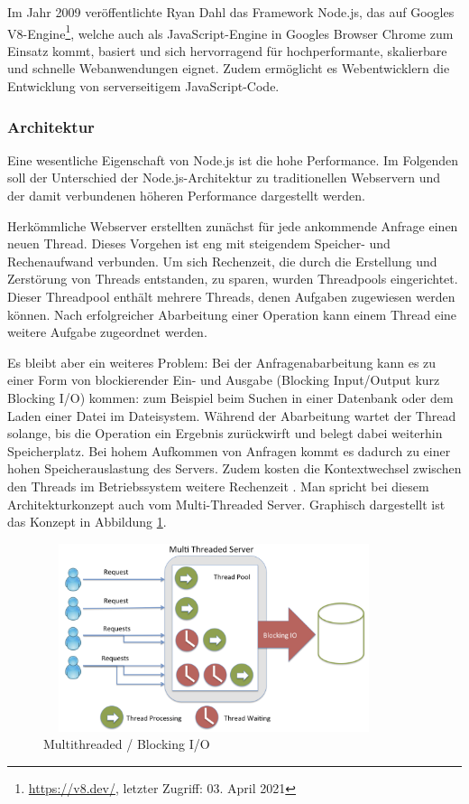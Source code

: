 Im Jahr 2009 veröffentlichte Ryan Dahl das Framework Node.js, das auf Googles V8-Engine\footnote{\url{https://v8.dev/}, letzter Zugriff: 03. April 2021}, welche auch als JavaScript-Engine in Googles Browser Chrome zum Einsatz kommt, basiert und sich hervorragend für hochperformante, skalierbare und schnelle Webanwendungen eignet. Zudem ermöglicht es Webentwicklern die Entwicklung von serverseitigem JavaScript-Code.


\subsubsection{Architektur}
Eine wesentliche Eigenschaft von Node.js ist die hohe Performance. Im Folgenden soll der Unterschied der Node.js-Architektur zu traditionellen Webservern und der damit verbundenen höheren Performance dargestellt werden.
\newline

\noindent
Herkömmliche Webserver erstellten zunächst für jede ankommende Anfrage einen neuen Thread. Dieses Vorgehen ist eng mit steigendem Speicher- und Rechenaufwand verbunden. Um sich Rechenzeit, die durch die Erstellung und Zerstörung von Threads entstanden, zu sparen, wurden Threadpools eingerichtet. Dieser Threadpool enthält mehrere Threads, denen Aufgaben zugewiesen werden können. Nach erfolgreicher Abarbeitung einer Operation kann einem Thread eine weitere Aufgabe zugeordnet werden.
\newline

\noindent
Es bleibt aber ein weiteres Problem: Bei der Anfragenabarbeitung kann es zu einer Form von blockierender Ein- und Ausgabe (Blocking Input/Output kurz Blocking I/O) kommen: zum Beispiel beim Suchen in einer Datenbank oder dem Laden einer Datei im Dateisystem.
 Während der Abarbeitung wartet der Thread solange, bis die Operation ein Ergebnis zurückwirft und belegt dabei weiterhin Speicherplatz. 
 Bei hohem Aufkommen von Anfragen kommt es dadurch zu einer hohen Speicherauslastung des Servers. Zudem kosten die Kontextwechsel zwischen den Threads im Betriebssystem weitere Rechenzeit \cite{Node1.05}. Man spricht bei diesem Architekturkonzept auch vom Multi-Threaded Server. Graphisch dargestellt ist das Konzept in Abbildung \ref{fig:Multithreaded}.
\newline

\begin{figure}[tbt]
\centering
\includegraphics[width=10cm, height = 5.5cm]{images/nodejs_otherthreading.png}
\caption[Multithreaded / Blocking I/O]{Multithreaded / Blocking I/O \cite{Node1.1}}
\label{fig:Multithreaded}
\end{figure}
 
